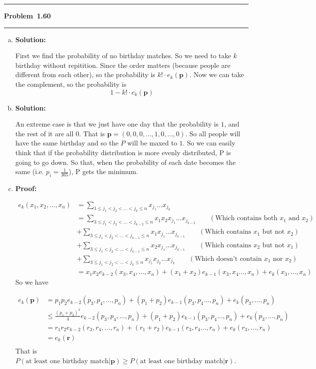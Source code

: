 \documentclass[10.5pt]{article}
\newcommand\question[1]{\vspace{.2in}\hrule\vspace{0.04in}\textbf{Problem\ #1}\vspace{.4em}\hrule\vspace{.10in}}
\newcommand\minsolution{\vspace{.3in}\textbf{Solution:}\vspace{.4em}\par}
\newcommand\minproof{\vspace{.3in}\textbf{Proof:}\vspace{.4em}\par}
\begin{document}
	\question{1.60}
	\begin{enumerate}[(a)]
		\item \minsolution{}
		First we find the probability of no birthday matches. So we need to take $k$ birthday without repitition. 
		Since the order matters (because people are different from each other), so the probability is $k!\cdot e_k(\boldsymbol{p})$.
		Now we can take the complement, so the probability is $$1-k!\cdot e_k(\boldsymbol{p})$$
		\item \minsolution{}
		An extreme case is that we just have one day that the probability is $1$, and the rest of it are all $0$. That is $\boldsymbol{p} = (0, 0, 0, \dots, 1, 0, \dots, 0)$.
		So all people will have the same birthday and so the $P$ will be maxed to $1$. So we can easily think that if the probability distribution is more evenly distributed, P is going to go down. 
		So that, when the probability of each date becomes the same (i.e. $p_i = \frac{1}{365}$), P gets the minimum.
		\item \minproof{}
		\begin{align*}
			e_k(x_1,x_2,\dots,x_n) &= \sum_{1\leqslant j_1<j_2< \dots<j_k\leqslant n} x_{j_1}\dots x_{j_k}\\[8pt]
			&= \sum_{3\leqslant j_1<j_2< \dots <j_{k-2}\leqslant n} x_1x_2x_{j_1}\dots x_{j_{k-2}}\qquad(\text{Which contains both $x_1$ and $x_2$})\\[8pt]
			&+ \sum_{3\leqslant j_1<j_2< \dots <j_{k-1}\leqslant n} x_1x_{j_1}\dots x_{j_{k-1}}\qquad(\text{Which contains $x_1$ but not $x_2$})\\[8pt]
			&+ \sum_{3\leqslant j_1<j_2< \dots <j_{k-1}\leqslant n} x_2x_{j_1}\dots x_{j_{k-1}}\qquad(\text{Which contains $x_2$ but not $x_1$})\\[8pt]
			&+  \sum_{3\leqslant j_1<j_2< \dots <j_{k}\leqslant n} x_{j_1}x_{j_2}\dots x_{j_{k}}\qquad(\text{Which doesn't contain $x_1$ nor $x_2$})\\[8pt]
			&= x_1x_2e_{k-2}(x_3,x_4,\dots,x_n)+(x_1+x_2)e_{k-1}(x_3, x_4\dots, x_n)+e_k(x_3, \dots, x_n)
		\end{align*}
		So we have

		\begin{align*}
			e_k(\boldsymbol{p})&=p_1p_2e_{k-2}(p_3,p_4,\dots,p_n)+(p_1+p_2)e_{k-1}(p_3, p_4\dots, p_n)+e_k(p_3, \dots, p_n)\\[8pt]
			&\leqslant \frac{(p_1+p_2)^2}{4}e_{k-2}(p_3,p_4,\dots,p_n)+(p_1+p_2)e_{k-1}(p_3, p_4\dots, p_n)+e_k(p_3, \dots, p_n)\\[8pt]
			&= r_1r_2e_{k-2}(r_3,r_4,\dots,r_n)+(r_1+r_2)e_{k-1}(r_3, r_4\dots, r_n)+e_k(r_3, \dots, r_n)\\[8pt]
			&= e_k(\boldsymbol{r})\\[8pt]
		\end{align*}
		That is $P(\text{at least one birthday match}| \boldsymbol{p})\geqslant P(\text{at least one birthday match}| \boldsymbol{r})$.


\end{enumerate}
\end{document}
